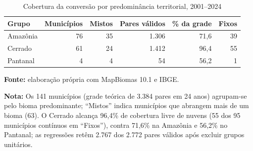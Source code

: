 \begin{table}[htbp]
\centering
\footnotesize
\captionstyle{\centering}
\normalcaption
\caption{Cobertura da conversão por predominância territorial, 2001--2024}\label{tab:h1-cobertura}
\begin{tabular}{lrrrrr}
\toprule
Grupo & Municípios & Mistos & Pares válidos & \% da grade & Fixos \\
\midrule
Amazônia & 76 & 35 & 1.306 & 71,6 & 39 \\
Cerrado & 61 & 24 & 1.412 & 96,4 & 55 \\
Pantanal & 4 & 4 & 54 & 56,2 & 1 \\
\bottomrule
\end{tabular}
\par\smallskip\begin{minipage}{\textwidth}\footnotesize
\SingleSpacing
\noindent\textbf{Fonte:} elaboração própria com MapBiomas 10.1 e IBGE.\par\medskip
\noindent\textbf{Nota:} Os 141 municípios (grade teórica de 3.384 pares em 24 anos) agrupam-se pelo bioma predominante; ``Mistos'' indica municípios que abrangem mais de um bioma (63). O Cerrado alcança 96,4\% de cobertura livre de nuvens (55 dos 95 municípios contínuos em ``Fixos''), contra 71,6\% na Amazônia e 56,2\% no Pantanal; as regressões retêm 2.767 dos 2.772 pares válidos após excluir grupos unitários.
\end{minipage}
\end{table}
